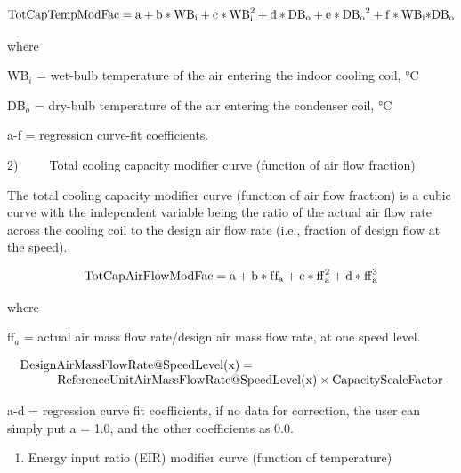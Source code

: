\begin{equation}
{\rm{TotCapTempModFac}} = {\rm{a}} + {\rm{b*W}}{{\rm{B}}_{\rm{i}}} + {\rm{c*WB}}_{\rm{i}}^2 + {\rm{d*D}}{{\rm{B}}_{\rm{o}}} + {\rm{e*D}}{{\rm{B}}_{\rm{o}}}^2 + {\rm{f*W}}{{\rm{B}}_{\rm{i}}}{\rm{*D}}{{\rm{B}}_{\rm{o}}}
\end{equation}

where

WB\(_{i}\) = wet-bulb temperature of the air entering the indoor cooling coil, °C

DB\(_{o}\) = dry-bulb temperature of the air entering the condenser coil, °C

a-f = regression curve-fit coefficients.

2)~~~~~Total cooling capacity modifier curve (function of air flow fraction)

The total cooling capacity modifier curve (function of air flow fraction) is a cubic curve with the independent variable being the ratio of the actual air flow rate across the cooling coil to the design air flow rate (i.e., fraction of design flow at the speed).

\begin{equation}
{\rm{TotCapAirFlowModFac}} = {\rm{a}} + {\rm{b*f}}{{\rm{f}}_{\rm{a}}} + {\rm{c*ff}}_{\rm{a}}^2 + {\rm{d*ff}}_{\rm{a}}^3
\end{equation}

where

ff\(_{a}\) = actual air mass flow rate/design air mass flow rate, at one speed level.

\begin{equation}
  \begin{array}{l}
    {\rm{DesignAirMassFlowRate}}@{\rm{SpeedLevel}}({\rm{x}}) = {\rm{}}\\\quad \quad \quad {\rm{ReferenceUnitAirMassFlowRate}}@{\rm{SpeedLevel}}({\rm{x}}) \times {\rm{CapacityScaleFactor}}
  \end{array}
\end{equation}

a-d = regression curve fit coefficients, if no data for correction, the user can simply put a = 1.0, and the other coefficients as 0.0.

\begin{enumerate}
\def\labelenumi{\arabic{enumi})}
\setcounter{enumi}{2}
\tightlist
\item
  Energy input ratio (EIR) modifier curve (function of temperature)
\end{enumerate}

